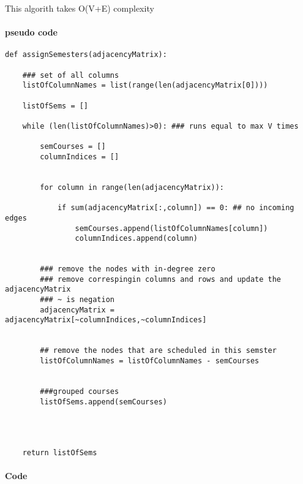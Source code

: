 \documentclass[11pt]{article}
\begin{document}
This algorith takes O(V+E) complexity

    \paragraph{pseudo code}\label{pseudo-code}

\begin{verbatim}
def assignSemesters(adjacencyMatrix):

    ### set of all columns
    listOfColumnNames = list(range(len(adjacencyMatrix[0]))) 
    
    listOfSems = []
    
    while (len(listOfColumnNames)>0): ### runs equal to max V times
      
        semCourses = []
        columnIndices = []
        
        
        for column in range(len(adjacencyMatrix)):
            
            if sum(adjacencyMatrix[:,column]) == 0: ## no incoming edges
                semCourses.append(listOfColumnNames[column])
                columnIndices.append(column)
        
        
        ### remove the nodes with in-degree zero
        ### remove correspingin columns and rows and update the adjacencyMatrix
        ### ~ is negation
        adjacencyMatrix = adjacencyMatrix[~columnIndices,~columnIndices]
        

        ## remove the nodes that are scheduled in this semster
        listOfColumnNames = listOfColumnNames - semCourses 
        
        
        ###grouped courses
        listOfSems.append(semCourses)
        
        

        
    return listOfSems
\end{verbatim}

    \paragraph{Code}\label{code}
\end{document}
